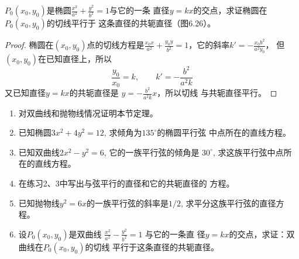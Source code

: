 \begin{example}
    $P_0(x_0,y_0)$是椭圆$\frac{x^2}{a^2}+\frac{y^2}{b^2}=1$与它的一条
直径$y=kx$的交点，求证椭圆在$P_0(x_0,y_0)$的切线平行于
这条直径的共轭直径（图6.26）。
\end{example}

\begin{proof}
    椭圆在$(x_0,y_0)$点的切线方程是$\frac{x_0x}{a^2}+\frac{y_0y}{b^2}=1$，它的斜率$k'=-\frac{x_0b^2}{a^2y_0}$，
    但$(x_0,y_0)$在已知直径上，所以
\[\frac{y_0}{x_0}=k,\qquad k'=-\frac{b^2}{a^2k}\]
又已知直径$y=kx$的共轭直径是
$y=-\frac{b^2}{a^2k}x$，所以切线
与共轭直径平行。
\end{proof}


\begin{ex}
\begin{enumerate}
    \item 对双曲线和抛物线情况证明本节定理。
    \item 已知椭圆$3x^2+4y^2=12$, 求倾角为$135^{\circ}$的椭圆平行弦
    中点所在的直线方程。
    \item 已知双曲线$2x^2-y^2=6$, 它的一族平行弦的倾角是
    $30^{\circ}$, 求这族平行弦中点所在的直线方程。
    \item 在练习2、3中写出与弦平行的直径和它的共轭直径的
    方程。
    \item 已知抛物线$y^2=6x$的一族平行弦的斜率是$1/2$, 
    求平分这族平行弦的直径方程。
    \item 设$P_0(x_0,y_0)$是双曲线
    $\frac{x^2}{a^2}-\frac{y^2}{b^2}=1$
    与它的一条直
    径$y=kx$的交点，求证：双曲线在$P_0(x_0,y_0)$的切线
    平行于这条直径的共轭直径。
\end{enumerate}
\end{ex}


